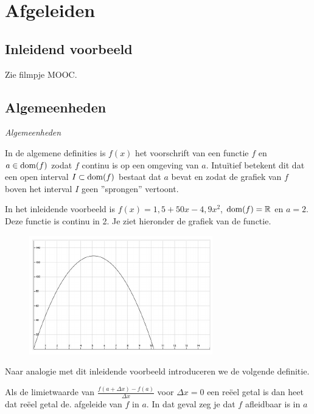 \section{Afgeleiden}

\subsection{Inleidend voorbeeld}
Zie filmpje MOOC.

\subsection{Algemeenheden}

\emph{Algemeenheden}

In de algemene definities is $f(x)$ het voorschrift van een functie $f$ en $a \in \operatorname{dom} (f)$ zodat $f$ continu is op een omgeving van $a$.
Intu\"itief betekent dit dat een open interval $I \subset \operatorname{dom} (f)$ bestaat dat $a$ bevat en zodat de grafiek van $f$ boven het interval $I$ geen ''sprongen'' vertoont.\vspace{5mm}

\begin{voorbeeld}
	In het inleidende voorbeeld is $f(x)=1,5+50 x -4,9 x^2$, $\operatorname{dom} (f)= \mathbb{R}$ en $a=2$.
	Deze functie is continu in 2. Je ziet hieronder de grafiek van de functie.
	\begin{figure}[h]
		\begin{center}
			\includegraphics[height=5 cm]{6_afgeleiden_integralen/inputs/graf.JPG}
		\end{center}
	\end{figure}
\end{voorbeeld}

Naar analogie met dit inleidende voorbeeld introduceren we de volgende definitie.

\begin{definitie}
	Als de limietwaarde van $\frac{f(a+\Delta x)-f(a)}{\Delta x}$ voor $\Delta x = 0$ een re\"eel getal is dan heet dat re\"eel getal de. afgeleide van $f$ in $a$.
	In dat geval zeg je dat $f$ afleidbaar is in $a$
\end{definitie}

